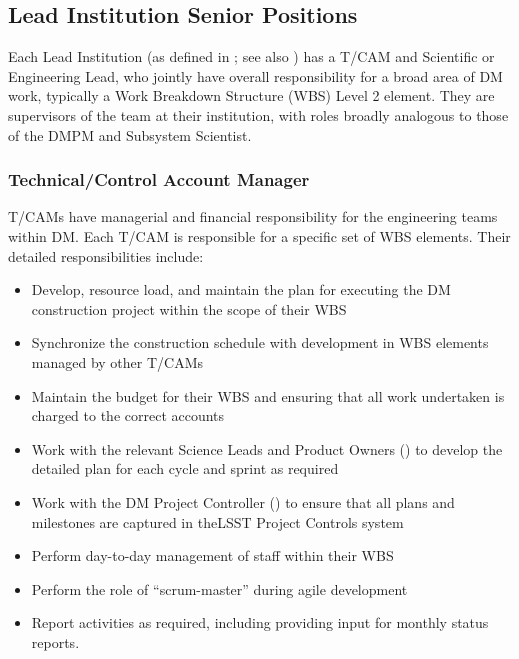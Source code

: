 \subsection{Lead Institution Senior Positions}

Each Lead Institution (as defined in ; see also ) has a \gls{T/CAM} and Scientific or Engineering Lead, who jointly have overall responsibility for a broad area of DM work, typically a \gls{Work Breakdown Structure} (\gls{WBS}) Level 2 element. They are supervisors of the team at their institution, with roles broadly analogous to those of the \gls{DMPM} and \gls{Subsystem Scientist}.

\subsubsection{Technical/Control Account Manager} \label{role:tcam}

\glspl{T/CAM} have managerial and financial responsibility for the engineering teams within DM.
Each \gls{T/CAM} is responsible for a specific set of \gls{WBS} elements.
Their detailed responsibilities include:

\begin{itemize}

  \item{Develop, resource load, and maintain the plan for executing the DM construction project within the scope of their WBS}
  \item{Synchronize the construction schedule with development in \gls{WBS} elements managed by other T/CAMs}
  \item{Maintain the budget for their \gls{WBS} and ensuring that all work undertaken is charged to the correct accounts}
  \item{Work with the relevant Science Leads and Product Owners () to develop the detailed plan for each cycle and sprint as required}
  \item{Work with the DM Project Controller () to ensure that all plans and milestones are captured in theLSST Project Controls system}
  \item{Perform day-to-day management of staff within their \gls{WBS}}
  \item{Perform the role of ``scrum-master'' during agile development}
  \item{Report activities as required, including providing input for monthly status reports.}

\end{itemize}

